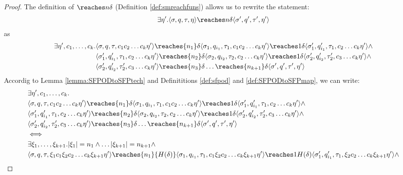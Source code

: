 \begin{proof}
  The definition of $\reaches n \delta$ (Definition \ref{def:smreachfuns}) allows us to rewrite the statement:
  $$
  \exists \eta'. \langle \sigma, q, \tau, \eta\rangle\reaches n \delta \langle \sigma', q', \tau', \eta'\rangle
  $$
  as
  \begin{align*}
    \exists \eta', c_1, \ldots, c_k. &\langle \sigma, q, \tau, c_1c_2\ldots c_k\eta'\rangle\reaches {n_1} \delta \langle \sigma_1, q_{i_1}, \tau_1, c_1c_2\ldots c_k\eta'\rangle\reaches 1 \delta \langle \sigma_1', q_{i_1}', \tau_1, c_2\ldots c_k\eta'\rangle \land \\
     &\langle \sigma_1', q_{i_1}', \tau_1, c_2\ldots c_k\eta'\rangle  \reaches {n_2} \delta \langle \sigma_2, q_{i_2}, \tau_2, c_2\ldots c_k\eta'\rangle\reaches 1 \delta \langle \sigma_2', q_{i_2}', \tau_2', c_3\ldots c_k\eta'\rangle \land \\
     &\langle \sigma_2', q_{i_2}', \tau_2', c_3\ldots c_k\eta'\rangle \reaches {n_3} \delta \ldots \reaches {n_{k+1}} \delta
    \langle \sigma', q', \tau', \eta'\rangle
  \end{align*}
  Accordig to Lemma \ref{lemma:SFPODtoSFPtech} and Definititions \ref{def:sfpod} and \ref{def:SFPODtoSFPmap}, we can write:
  \small
  \begin{align*}
    &\exists \eta', c_1, \ldots, c_k. \\&\langle \sigma, q, \tau, c_1c_2\ldots c_k\eta'
    \rangle\reaches {n_1} \delta \langle \sigma_1, q_{i_1}, \tau_1, c_1c_2\ldots c_k\eta'\rangle\reaches 1 \delta \langle \sigma_1', q_{i_1}', \tau_1, c_2\ldots c_k\eta'\rangle \land \\
     &\langle \sigma_1', q_{i_1}', \tau_1, c_2\ldots c_k\eta'\rangle  \reaches {n_2} \delta \langle \sigma_2, q_{i_2}, \tau_2, c_2\ldots c_k\eta'\rangle\reaches 1 \delta \langle \sigma_2', q_{i_2}', \tau_2', c_3\ldots c_k\eta'\rangle \land \\
     &\langle \sigma_2', q_{i_2}', \tau_2', c_3\ldots c_k\eta'\rangle \reaches {n_3} \delta \ldots \reaches {n_{k+1}} \delta
    \langle \sigma', q', \tau', \eta'\rangle\\
    &\Longleftrightarrow\\
    &\exists \xi_1, \ldots, \xi_{k+1}. |\xi_1|=n_1\land \ldots |\xi_{k+1}|=n_{k+1}\land\\
    &\langle \sigma, q, \tau, \xi_1c_1\xi_2c_2\ldots c_k\xi_{k+1}\eta'\rangle\reaches {n_1} {H(\delta)} \langle \sigma_1, q_{i_1}, \tau_1, c_1\xi_2c_2\ldots c_k\xi_{k+1}\eta'\rangle\reaches 1 {H(\delta)} \langle \sigma_1', q_{i_1}', \tau_1, \xi_2c_2\ldots c_k\xi_{k+1}\eta'\rangle \land \\

\end{align*}
\end{proof}

